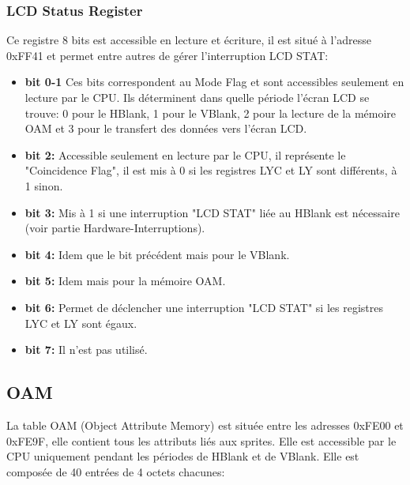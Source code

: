 \documentclass[french]{report}
\begin{document}
\subsubsection{LCD Status Register}
Ce registre 8 bits est accessible en lecture et écriture, il est situé à l'adresse 0xFF41 et permet entre autres de gérer l'interruption LCD STAT:\\

\begin{itemize}
\item \textbf{bit 0-1}
	Ces bits correspondent au Mode Flag et sont accessibles seulement en lecture par le CPU. Ils déterminent dans quelle période l'écran LCD se trouve: 0 pour le HBlank, 1 pour le VBlank, 2 pour la lecture de la mémoire OAM et 3 pour le transfert des données vers l'écran LCD.\\
\item \textbf{bit 2:}
	Accessible seulement en lecture par le CPU, il représente le "Coincidence Flag", il est mis à 0 si les registres LYC et LY sont différents, à 1 sinon.\\
\item \textbf{bit 3:}
	Mis à 1 si une interruption "LCD STAT" liée au HBlank est nécessaire (voir partie Hardware-Interruptions).\\
\item \textbf{bit 4:} 
	Idem que le bit précédent mais pour le VBlank.\\
\item \textbf{bit 5:}
	Idem mais pour la mémoire OAM.\\
\item \textbf{bit 6:}
	Permet de déclencher une interruption "LCD STAT" si les registres LYC et LY sont égaux.\\
\item \textbf{bit 7:}
	Il n'est pas utilisé.\\
\end{itemize}

\subsection{OAM}
	La table OAM (Object Attribute Memory) est située entre les adresses 0xFE00 et 0xFE9F, elle contient tous les attributs liés aux sprites. Elle est accessible par le CPU uniquement pendant les périodes de HBlank et de VBlank. Elle est composée de 40 entrées de 4 octets chacunes:\\
\end{document}
